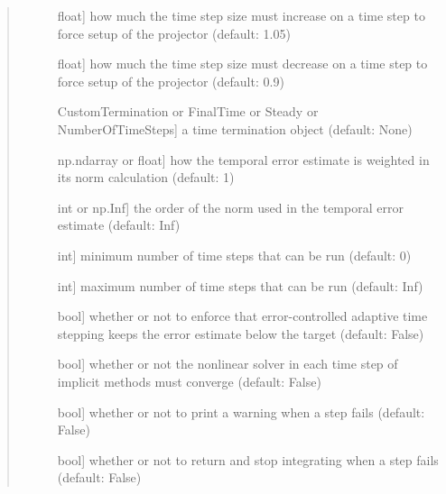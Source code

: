 \documentclass[letterpaper,10pt,english]{sphinxmanual}
\begin{document}
\begin{fulllineitems}
\begin{quote}
\begin{description}
\begin{description}
\item[{}] \leavevmode{[}float{]}
how much the time step size must increase on a time step to force setup of the projector (default: 1.05)

\item[{}] \leavevmode{[}float{]}
how much the time step size must decrease on a time step to force setup of the projector (default: 0.9)

\item[{}] \leavevmode{[}CustomTermination or FinalTime or Steady or NumberOfTimeSteps{]}
a time termination object (default: None)

\item[{}] \leavevmode{[}np.ndarray or float{]}
how the temporal error estimate is weighted in its norm calculation (default: 1)

\item[{}] \leavevmode{[}int or np.Inf{]}
the order of the norm used in the temporal error estimate (default: Inf)

\item[{}] \leavevmode{[}int{]}
minimum number of time steps that can be run (default: 0)

\item[{}] \leavevmode{[}int{]}
maximum number of time steps that can be run (default: Inf)

\item[{}] \leavevmode{[}bool{]}
whether or not to enforce that error-controlled adaptive time stepping keeps the error estimate below the target (default: False)

\item[{}] \leavevmode{[}bool{]}
whether or not the nonlinear solver in each time step of implicit methods must converge (default: False)

\item[{}] \leavevmode{[}bool{]}
whether or not to print a warning when a step fails (default: False)

\item[{}] \leavevmode{[}bool{]}
whether or not to return and stop integrating when a step fails (default: False)


\end{description}
\end{description}
\end{quote}
\end{fulllineitems}
\end{document}
